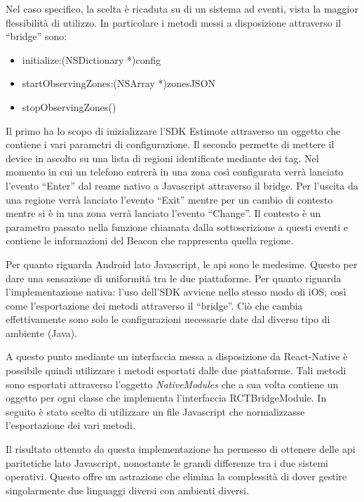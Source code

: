 Nel caso specifico, la scelta è ricaduta su di un sistema ad eventi, vista la maggior flessibilità di utilizzo. In particolare i metodi messi a disposizione attraverso il “bridge” sono:\vspace{5mm}

\begin{itemize}
	\item initialize:(NSDictionary *)config
	\item startObservingZones:(NSArray *)zonesJSON
	\item stopObservingZones()
\end{itemize}\vspace{5mm}
	
Il primo ha lo scopo di inizializzare l'SDK Estimote attraverso un oggetto che contiene i vari parametri di configurazione. Il secondo permette di mettere il device in ascolto su una lista di regioni identificate mediante dei tag. Nel momento in cui un telefono entrerà in una zona così configurata verrà lanciato l’evento “Enter” dal reame nativo a Javascript attraverso il bridge. Per l’uscita da una regione verrà lanciato l’evento “Exit” mentre per un cambio di contesto mentre si è in una zona verrà lanciato l'evento “Change”. Il contesto è un parametro passato nella funzione chiamata dalla sottoscrizione a questi eventi e contiene le informazioni del Beacon che rappresenta quella regione.\vspace{5mm}

Per quanto riguarda Android lato Javascript, le api sono le medesime. Questo per dare una sensazione di uniformità tra le due piattaforme. Per quanto riguarda l’implementazione nativa: l'uso dell’SDK avviene nello stesso modo di iOS; così come l’esportazione dei metodi attraverso il “bridge”. Ciò che cambia effettivamente sono solo le configurazioni necessarie date dal diverso tipo di ambiente (Java).\vspace{5mm}

A questo punto mediante un interfaccia messa a disposizione da React-Native è possibile quindi utilizzare i metodi esportati dalle due piattaforme. Tali metodi sono esportati attraverso l’oggetto \emph{NativeModules} che a sua volta contiene un oggetto per ogni classe che implementa l’interfaccia RCTBridgeModule. In seguito è stato scelto di utilizzare un file Javascript che normalizzasse l’esportazione dei vari metodi.\vspace{5mm}

Il risultato ottenuto da questa implementazione ha permesso di ottenere delle api paritetiche lato Javascript, nonostante le grandi differenze tra i due sistemi operativi. Questo offre un astrazione che elimina la complessità di dover gestire singolarmente due linguaggi diversi con ambienti diversi. \vspace{5mm}

